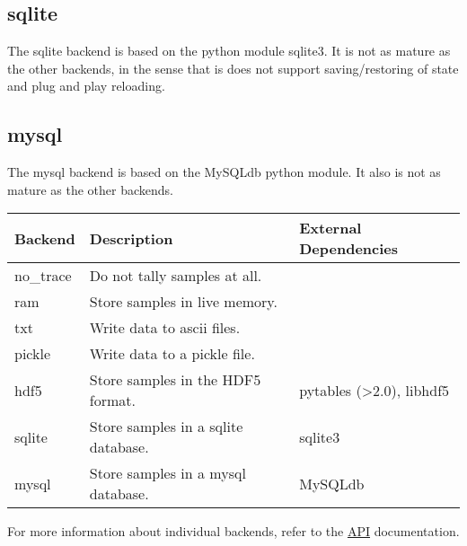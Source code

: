 \subsection*{sqlite}

The sqlite backend is based on the python module sqlite3. It is not as mature as the other backends, in the sense that is does not support saving/restoring of state and plug and play reloading.



\hypertarget{mysql}{}
\subsection*{mysql}

The mysql backend is based on the MySQLdb python module. It also is not as mature as the other backends.

\begin{longtable}[c]{|p{0.13\locallinewidth}|p{0.45\locallinewidth}|p{0.31\locallinewidth}|}
\hline
\textbf{
Backend
} & \textbf{
Description
} & \textbf{
External Dependencies
} \\
\hline
\endhead

no{\_}trace
 & 
Do not tally samples at all.
 &  \\
\hline

ram
 & 
Store samples in live memory.
 &  \\
\hline

txt
 & 
Write data to ascii files.
 &  \\
\hline

pickle
 & 
Write data to a pickle file.
 &  \\
\hline

hdf5
 & 
Store samples in the HDF5 format.
 & 
pytables ({\textgreater}2.0), libhdf5
 \\
\hline

sqlite
 & 
Store samples in a sqlite database.
 & 
sqlite3
 \\
\hline

mysql
 & 
Store samples in a mysql database.
 & 
MySQLdb
 \\
\hline
\end{longtable}

For more information about individual backends, refer to the \href{docs/API.pdf}{API} documentation.

